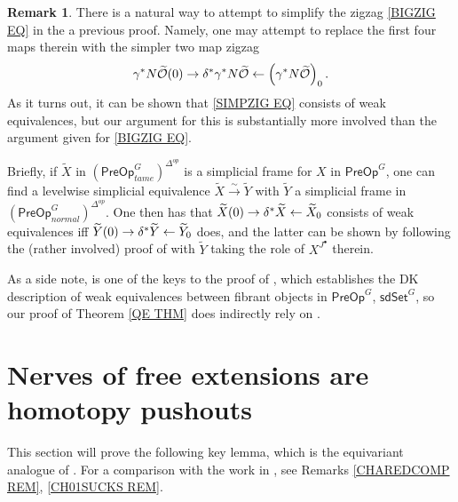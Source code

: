 \documentclass[a4paper,10pt
,draft
]{article}%
\numberwithin{equation}{section}
\numberwithin{figure}{section}
\theoremstyle{definition} %
\newtheorem{remark}[equation]{Remark}%
\renewcommand{\O}{\ensuremath{\mathcal O}}
\newcommand{\1}{\ensuremath{\mathbbm 1}}%
\begin{document}
\begin{remark}
	There is a natural way to attempt to simplify the zigzag
	\eqref{BIGZIG EQ}
	in the a previous proof. 
	Namely, one may attempt to replace the first four maps therein
	with the simpler two map zigzag
\begin{equation}\label{SIMPZIG EQ}
	\gamma^{\**} N \widetilde{\O}(0)
\to 
	\delta^{\**} \gamma^{\**} N \widetilde{\O}
\leftarrow
	\left(\gamma^{\**} N \widetilde{\O}\right)_0.
\end{equation}
As it turns out, it can be shown that 
\eqref{SIMPZIG EQ} consists of weak equivalences, 
but our argument for this is substantially more involved than the argument given for \eqref{BIGZIG EQ}.

Briefly, if $\widetilde{X}$
in $\left(\mathsf{PreOp}^G_{tame}\right)^{\Delta^{op}}$
is a simplicial frame for $X$ in 
$\mathsf{PreOp}^G$,
one can find a levelwise simplicial equivalence
$\widetilde{X} \xrightarrow{\sim} \widetilde{Y}$
with $\widetilde{Y}$
a simplicial frame in
$\left(\mathsf{PreOp}^G_{normal}\right)^{\Delta^{op}}$.
One then has that 
$\widetilde{X}(0) \to \delta^{\**}\widetilde{X} \leftarrow \widetilde{X}_0$ 
consists of weak equivalences iff
$\widetilde{Y}(0) \to \delta^{\**}\widetilde{Y} \leftarrow \widetilde{Y}_0$ does,
and the latter can be shown by following the
(rather involved) proof of 
\cite[Prop. 5.41]{BP_edss}
with $\widetilde{Y}$ taking the role
of $X^{J^{\bullet}}$ therein.

As a side note, 
\cite[Prop. 5.41]{BP_edss} is one of the keys to the proof of
\cite[Thm. 5.48]{BP_edss}, 
which establishes the DK description of weak equivalences between fibrant objects in
$\mathsf{PreOp}^G$, $\mathsf{sdSet}^G$,
so our proof of Theorem \ref{QE THM}
does indirectly rely on \cite[Prop. 5.41]{BP_edss}.
\end{remark}



 
\section{Nerves of free extensions are homotopy pushouts}
\label{KEYRES SEC}

This section will prove the following key lemma,
which is the equivariant analogue of
\cite[Prop. 3.2]{CM13b}.
For a comparison with the work in \cite[\S 3]{CM13b},
see Remarks \ref{CHAREDCOMP REM}, \ref{CH01SUCKS REM}.
\end{document}
